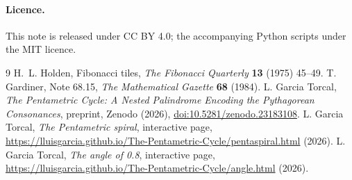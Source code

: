\documentclass[11pt,a4paper]{article}
\theoremstyle{plain}
\theoremstyle{definition}
\theoremstyle{remark}
\begin{document}
\paragraph{Licence.} This note is released under CC BY 4.0; the accompanying Python scripts under the MIT licence.

\begin{thebibliography}{9}
 H.~L. Holden, Fibonacci tiles, \emph{The Fibonacci Quarterly} \textbf{13} (1975) 45--49.
 T. Gardiner, Note 68.15, \emph{The Mathematical Gazette} \textbf{68} (1984).
 L. Garcia Torcal, \emph{The Pentametric Cycle: A Nested Palindrome Encoding the Pythagorean Consonances}, preprint, Zenodo (2026), \href{https://doi.org/10.5281/zenodo.23183108}{doi:10.5281/zenodo.23183108}.
 L. Garcia Torcal, \emph{The Pentametric spiral}, interactive page, \url{https://lluisgarcia.github.io/The-Pentametric-Cycle/pentaspiral.html} (2026).
 L. Garcia Torcal, \emph{The angle of 0.8}, interactive page, \url{https://lluisgarcia.github.io/The-Pentametric-Cycle/angle.html} (2026).
\end{thebibliography}
\end{document}
